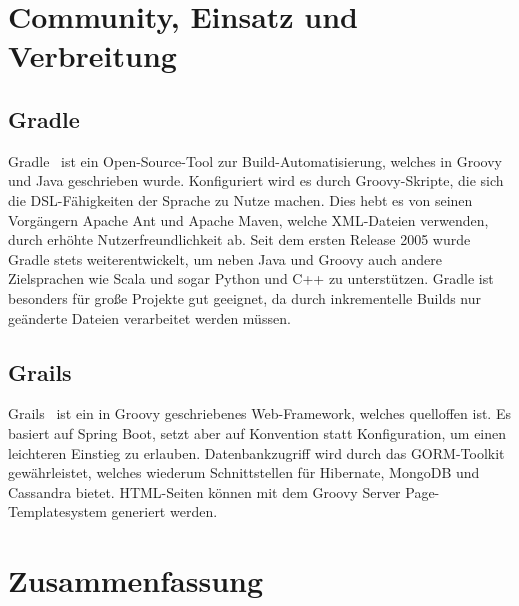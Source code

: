 
\section{Community, Einsatz und Verbreitung}\label{sec:community}


\subsection{Gradle}\label{subsec:gradle}

Gradle~\cite{gradle} ist ein Open-Source-Tool zur Build-Automatisierung, welches in Groovy und Java geschrieben wurde.
Konfiguriert wird es durch Groovy-Skripte, die sich die DSL-Fähigkeiten der Sprache zu Nutze machen.
Dies hebt es von seinen Vorgängern Apache Ant und Apache Maven, welche XML-Dateien verwenden, durch erhöhte Nutzerfreundlichkeit ab.
Seit dem ersten Release 2005 wurde Gradle stets weiterentwickelt, um neben Java und Groovy auch andere Zielsprachen wie Scala und sogar Python und C++ zu unterstützen.
Gradle ist besonders für große Projekte gut geeignet, da durch inkrementelle Builds nur geänderte Dateien verarbeitet werden müssen.

\subsection{Grails}\label{subsec:grails}

Grails~\cite{grails} ist ein in Groovy geschriebenes Web-Framework, welches quelloffen ist.
Es basiert auf Spring Boot, setzt aber auf Konvention statt Konfiguration, um einen leichteren Einstieg zu erlauben.
Datenbankzugriff wird durch das GORM-Toolkit gewährleistet, welches wiederum Schnittstellen für Hibernate, MongoDB und Cassandra bietet.
HTML-Seiten können mit dem Groovy Server Page-Templatesystem generiert werden.


\section{Zusammenfassung}\label{sec:zusammenfassung}







